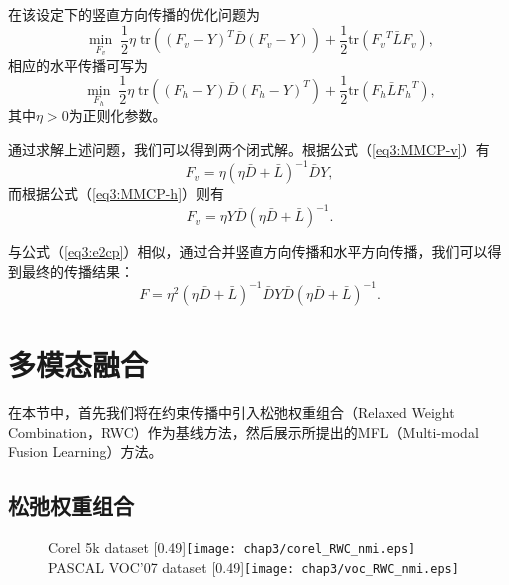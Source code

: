 在该设定下的竖直方向传播的优化问题为
\begin{equation}
\mathop{\mathrm{min}}_{{F_v}}\; \frac{1}{2}\eta\; \mathrm{tr}(({F_v}-{Y})^T\bar{{D}}({F_v}-{Y})) +\frac{1}{2}\mathrm{tr}({F_v}^T \bar{{L}}{F_v}),
\label{eq3:MMCP-v}
\end{equation}
相应的水平传播可写为
\begin{equation}
\mathop{\mathrm{min}}_{{F_h}}\;\frac{1}{2}\eta \;\mathrm{tr}( ({F_h}-{Y})\bar{{D}}({F_h}-{Y})^T)+\frac{1}{2}\mathrm{tr}({F_h} \bar{{L}}{F_h}^T),
\label{eq3:MMCP-h}
\end{equation}
其中$ \eta > 0  $为正则化参数。

通过求解上述问题，我们可以得到两个闭式解。根据公式（\ref{eq3:MMCP-v}）有
\begin{equation}
{F_v} = \eta(\eta \bar{{D}}+\bar{{L}})^{-1}\bar{{D}}{Y},
\label{eq3:sol-v}
\end{equation}
而根据公式（\ref{eq3:MMCP-h}）则有
\begin{equation}
{F_v} = \eta {Y}\bar{{D}}(\eta \bar{{D}}+\bar{{L}})^{-1}.
\label{eq3:sol-h}
\end{equation}

与公式（\ref{eq3:e2cp}）相似，通过合并竖直方向传播和水平方向传播，我们可以得到最终的传播结果：
\begin{equation}
{F} = \eta^2(\eta\bar{{D}}+\bar{{L}})^{-1}{\bar{{D}} Y\bar{{D}}}(\eta\bar{{D}}+\bar{{L}})^{-1}.
\label{}
\end{equation}

\section{多模态融合}
在本节中，首先我们将在约束传播中引入松弛权重组合（Relaxed Weight Combination，RWC）作为基线方法，然后展示所提出的MFL（Multi-modal Fusion Learning）方法。
\subsection{松弛权重组合}
\label{sec3:rwc}

\begin{figure}[t]
	\centering
					{Corel 5k dataset}
					[0.49\textwidth]{\texttt{[image: chap3/corel\_RWC\_nmi.eps]}
                    \label{fig3:rwc_corel}}
					{PASCAL VOC'07 dataset}
					[0.49\textwidth]{\texttt{[image: chap3/voc\_RWC\_nmi.eps]}
                    \label{fig3:rwc_voc}}
	\label{fig3:rwc}
\end{figure}

